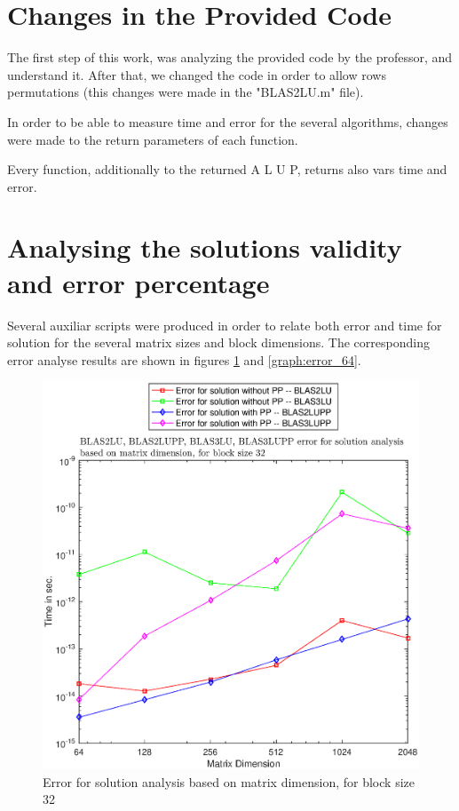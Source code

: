 \documentclass[conference,compsoc]{IEEEtran}
\begin{document}
\section{Changes in the Provided Code}
The first step of this work, was analyzing the provided code by the professor, and understand it. After that, we changed the code in order to allow rows permutations (this changes were made in the "BLAS2LU.m" file).\par 

In order to be able to measure time and error 
for the several algorithms, changes were made to the return parameters of each function. \par Every function, additionally to the returned A L U P, returns also vars time and error. 


\section{Analysing the solutions validity and error percentage}  
  
  Several auxiliar scripts were produced in order to relate both error and time for solution for the several matrix sizes and block dimensions.
       The corresponding error analyse results are shown in figures \ref{graph:error_32} and \ref{graph:error_64}.

  
    \begin{figure}[H]
     \centering
     \includegraphics[width=1\columnwidth]{error_32.eps}
     \caption{Error for solution analysis based on matrix dimension, for block size 32}
     \label{graph:error_32}
     \end{figure}
     
\end{document}
